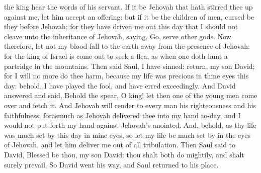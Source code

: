 the king hear the words of his servant. If it be Jehovah that hath stirred thee up against me, let him accept an offering: but if it be the children of men, cursed be they before Jehovah; for they have driven me out this day that I should not cleave unto the inheritance of Jehovah, saying, Go, serve other gods. Now therefore, let not my blood fall to the earth away from the presence of Jehovah: for the king of Israel is come out to seek a flea, as when one doth hunt a partridge in the mountains.  Then said Saul, I have sinned: return, my son David; for I will no more do thee harm, because my life was precious in thine eyes this day: behold, I have played the fool, and have erred exceedingly. And David answered and said, Behold the spear, O king! let then one of the young men come over and fetch it. And Jehovah will render to every man his righteousness and his faithfulness; forasmuch as Jehovah delivered thee into my hand to-day, and I would not put forth my hand against Jehovah’s anointed. And, behold, as thy life was much set by this day in mine eyes, so let my life be much set by in the eyes of Jehovah, and let him deliver me out of all tribulation. Then Saul said to David, Blessed be thou, my son David: thou shalt both do mightily, and shalt surely prevail. So David went his way, and Saul returned to his place. 

